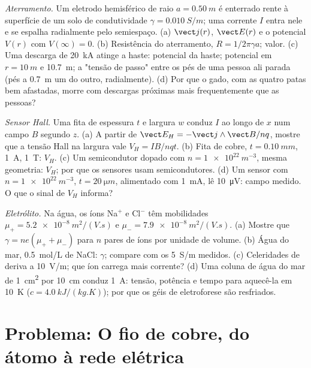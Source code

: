 \begin{exercise}[$\star\star\star$]\label{exo:b2:charges-currents-conduction:10}
\emph{Aterramento.} Um eletrodo hemisférico de raio $a = \qty{0.50}{m}$
é enterrado rente à superfície de um solo de condutividade $\gamma =
\qty{0.010}{S/m}$; uma corrente $I$ entra nele e se espalha radialmente pelo
semiespaço. (a) $\vect j(r)$, $\vect E(r)$ e o potencial $V(r)$ com $V(\infty) = 0$.
(b) Resistência do aterramento, $R = 1/2\pi\gamma a$; valor. (c) Uma
descarga de \qty{20}{kA} atinge a haste: potencial da haste;
potencial em $r = \qty{10}{m}$ e \qty{10.7}{m}; a "tensão de passo" entre
os pés de uma pessoa ali parada (pés a \qty{0.7}{m} um do outro, radialmente).
(d) Por que o gado, com as quatro patas bem afastadas, morre com
descargas próximas mais frequentemente que as pessoas?
\end{exercise}

\begin{exercise}[$\star\star\star$]\label{exo:b2:charges-currents-conduction:11}
\emph{Sensor Hall.} Uma fita de espessura $t$ e largura $w$ conduz $I$
ao longo de $x$ num campo $B$ segundo $z$. (a) A partir de $\vect E_H = -\vect j\wedge\vect B
/nq$, mostre que a tensão Hall na largura vale $V_H = IB/nqt$. (b)
Fita de cobre, $t = \qty{0.10}{mm}$, \qty{1}{A}, \qty{1}{T}: $V_H$. (c) Um
semicondutor dopado com $n = \qty{1e22}{m^{-3}}$, mesma geometria: $V_H$; por que
os sensores usam semicondutores. (d) Um sensor com $n = \qty{1e22}{m^{-3}}$, $t =
\qty{20}{\micro m}$, alimentado com \qty{1}{mA}, lê \qty{10}{\micro V}: campo medido.
O que o sinal de $V_H$ informa?
\end{exercise}

\begin{exercise}[$\star\star\star$]\label{exo:b2:charges-currents-conduction:12}
\emph{Eletrólito.} Na água, os íons Na$^+$ e Cl$^-$ têm mobilidades
$\mu_+ = \qty{5.2e-8}{m^2/(V.s)}$ e $\mu_- = \qty{7.9e-8}{m^2/(V.s)}$. (a)
Mostre que $\gamma = ne(\mu_+ + \mu_-)$ para $n$ pares de íons por unidade de volume.
(b) Água do mar, \qty{0.5}{mol/L} de NaCl: $\gamma$; compare com os \qty{5}{S/m}
medidos. (c) Celeridades de deriva a \qty{10}{V/m}; que íon carrega mais
corrente? (d) Uma coluna de água do mar de \qty{1}{cm^2} por \qty{10}{cm} conduz
\qty{1}{A}: tensão, potência e tempo para aquecê-la em \qty{10}{K} ($c =
\qty{4.0}{kJ/(kg.K)}$); por que os géis de eletroforese são resfriados.
\end{exercise}

\section{Problema: O fio de cobre, do átomo à rede elétrica}

